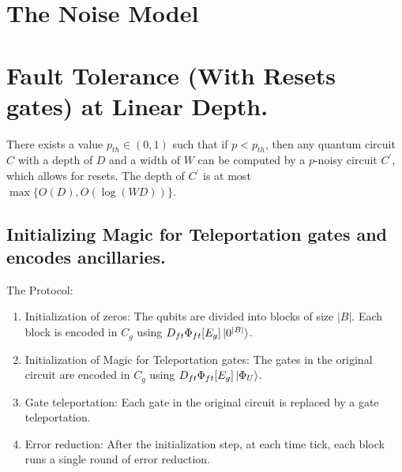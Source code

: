 \documentclass[manuscript,screen,review]{acmart}
\begin{document}
{\section{ The Noise Model }


\section{ Fault Tolerance (With Resets gates) at Linear Depth. } 

\begin{claim}
There exists a value $p_{th} \in (0,1)$ such that if $p < p_{th}$, then any quantum circuit $C$ with a depth of $D$ and a width of $W$ can be computed by a $p$-noisy circuit $C^{\prime}$, which allows for resets. The depth of $C^{\prime}$ is at most $\max{ \{O(D), O(\log(WD)) \} }$.
\end{claim}


\subsection{Initializing Magic for Teleportation gates and encodes ancillaries.}
The Protocol: \begin{enumerate}
  \item Initialization of zeros: The qubits are divided into blocks of size $|B|$. Each block is encoded in $C_{g}$ using $D_{ft} \Phi_{ft}[E_{g}] \ket{0^{|B|}}$.
  \item Initialization of Magic for Teleportation gates: The gates in the original circuit are encoded in $C_{g}$ using $D_{ft} \Phi_{ft}[E_{g}] \ket{\Phi_{U}}$.
  \item Gate teleportation: Each gate in the original circuit is replaced by a gate teleportation.
  \item Error reduction: After the initialization step, at each time tick, each block runs a single round of error reduction.
\end{enumerate}

}
\end{document}
